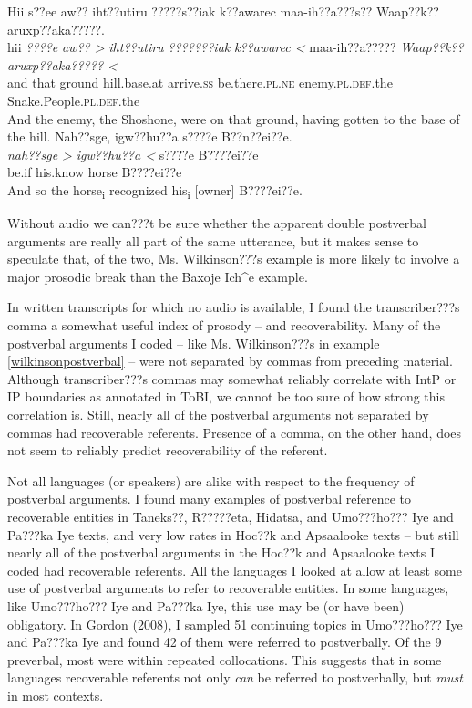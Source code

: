 \documentclass[output=paper]{LSP/langsci}
\begin{document}
\ea\label{multiplepostverbal}
\ea\label{wilkinsonmultiplepostverbal}
Hii s??ee aw?? iht??utiru ?????s??iak k??awarec maa-ih??a???s?? Waap??k??aruxp??aka?????.\footnotemark\\
\gll	hii 		\emph{????e} 		\emph{aw?? >}		\emph{iht??utiru} 			\emph{???????iak} 		\emph{k??awarec <}	maa-ih??a????? 				\emph{Waap??k??aruxp??aka????? <}\\
	and 		that	 		ground 			hill.base.at	 			arrive.\textsc{ss} 		be.there.\textsc{pl.ne}	enemy.\textsc{pl.def}.the 		Snake.People.\textsc{pl.def}.the\\
\glt	And the enemy, the Shoshone, were on that ground, having gotten to the base of the hill.
\ex\label{baxojemultiplepostverbal}
Nah??sge, igw??hu??a s????e B??n??ei??e.\footnotemark\\
\gll	\emph{nah??sge >}	\emph{igw??hu??a <}	s????e 		B????ei??e\\
	be.if 			his.know 			horse 		B????ei??e\\
\glt	And so the horse\textsubscript{i} recognized his\textsubscript{i} [owner] B????ei??e.
\z\z

Without audio we can???t be sure whether the apparent double postverbal arguments are really all part of the same utterance, but it makes sense to speculate that, of the two, Ms. Wilkinson???s example is more likely to involve a major prosodic break than the Baxoje Ich\^{}e example.

In written transcripts for which no audio is available, I found the transcriber???s comma a somewhat useful index of prosody -- and recoverability. Many of the postverbal arguments I coded -- like Ms. Wilkinson???s in example \ref{wilkinsonpostverbal} -- were not separated by commas from preceding material. Although transcriber???s commas may somewhat reliably correlate with IntP or IP boundaries as annotated in ToBI, we cannot be too sure of how strong this correlation is. Still, nearly all of the postverbal arguments not separated by commas had recoverable referents. Presence of a comma, on the other hand, does not seem to reliably predict recoverability of the referent.

Not all languages (or speakers) are alike with respect to the frequency of postverbal arguments. I found many examples of postverbal reference to recoverable entities in Taneks??, R?????eta, Hidatsa, and Umo???ho??? Iye and Pa???ka Iye texts, and very low rates in Hoc??k and Apsaalooke texts -- but still nearly all of the postverbal arguments in the Hoc??k and Apsaalooke texts I coded had recoverable referents. All the languages I looked at allow at least some use of postverbal arguments to refer to recoverable entities. In some languages, like Umo???ho??? Iye and Pa???ka Iye, this use may be (or have been) obligatory. In Gordon (2008), I sampled 51 continuing topics in Umo???ho??? Iye and Pa???ka Iye and found 42 of them were referred to postverbally. Of the 9 preverbal, most were within repeated collocations. This suggests that in some languages recoverable referents not only \emph{can} be referred to postverbally, but \emph{must} in most contexts.
\end{document}
